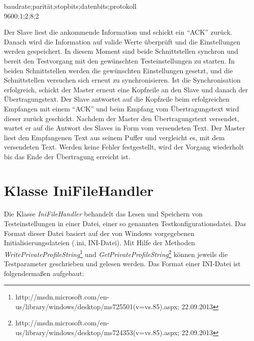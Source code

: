 \begin{center}
baudrate;parität;stopbits;datenbits;protokoll\\
9600;1;2;8;2
\end{center}

Der Slave liest die ankommende Information und schickt ein "`ACK"' zurück. Danach wird die Information auf valide Werte überprüft und die Einstellungen werden gespeichert. In diesem Moment sind beide Schnittstellen synchron und bereit den Testvorgang mit den gewünschten Testeinstellungen zu starten. In beiden Schnittstellen werden die gewünschten Einstellungen gesetzt, und die Schnittstellen versuchen sich erneut zu synchronisieren. Ist die Synchronisation erfolgreich, schickt der Master erneut eine Kopfzeile an den Slave und danach der Übertragungstext. Der Slave antwortet auf die Kopfzeile beim erfolgreichen Empfangen mit einem "`ACK"' und beim Empfang vom Übertragungstext wird dieser zurück geschickt. Nachdem der Master den Übertragungstext versendet, wartet er auf die Antwort des Slaves in Form vom versendeten Text. Der Master liest den Empfangenen Text aus seinem Puffer und vergleicht es, mit dem versendeten Text. Werden keine Fehler festgestellt, wird der Vorgang wiederholt bis das Ende der Übertragung erreicht ist.


\newpage


\section{Klasse IniFileHandler}\label{IniFileHandler}
\paragraph{}
Die Klasse \textit{IniFileHandler} behandelt das Lesen und Speichern von Testeinstellungen in einer Datei, einer so genannten Testkonfigurationsdatei. Das Format dieser Datei basiert auf der von Windows vorgegebenen Initialisierungsdateien (.ini, INI-Datei). Mit Hilfe der Methoden \textit{WritePrivateProfileString}\footnote{http://msdn.microsoft.com/en-us/library/windows/desktop/ms725501(v=vs.85).aspx; 22.09.2013} und \textit{GetPrivateProfileString}\footnote{http://msdn.microsoft.com/en-us/library/windows/desktop/ms724353(v=vs.85).aspx; 22.09.2013} können jeweils die Testparameter geschrieben und gelesen werden. Das Format einer INI-Datei ist folgendermaßen aufgebaut:\\

